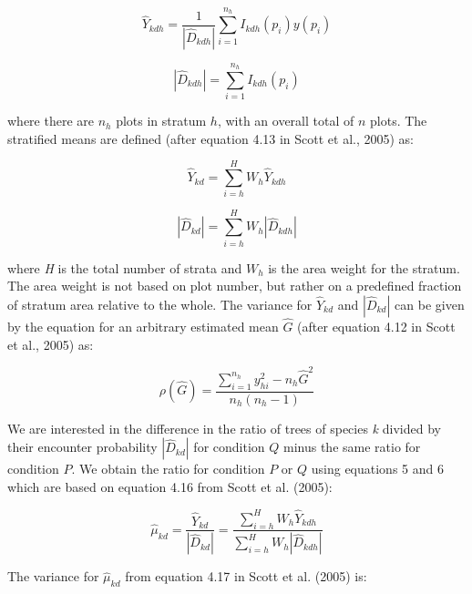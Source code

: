\documentclass[12pt]{article}
\begin{document}
\begin{equation}
\hat{Y}_{kdh} = \frac{1}{|\hat{D}_{kdh}|}\displaystyle\sum_{i=1}^{n_h} I_{kdh}(p_i)y(p_i)  
\end{equation} 

\begin{equation}
|\hat{D}_{kdh}| = \displaystyle\sum_{i=1}^{n_h} I_{kdh}(p_i)
\end{equation} 

where there are $n_h$ plots in stratum $h$, with an overall total of $n$ plots.  The stratified means are defined (after equation 4.13 in Scott et al., 2005) as: 

 \begin{equation} \label{eq:hatY}
\hat{Y}_{kd} = \displaystyle\sum_{i=h}^{H} W_h \hat{Y}_{kdh}
\end{equation} 

\begin{equation}  \label{eq:hatD}
|\hat{D}_{kd}| = \displaystyle\sum_{i=h}^{H} W_h |\hat{D}_{kdh}|
\end{equation} 

where \emph{H} is the total number of strata and $W_h$ is the area weight for the stratum. The area weight is not based on plot number, but rather on a predefined fraction of stratum area relative to the whole.  The variance for $\hat{Y}_{kd}$ and $|\hat{D}_{kd}|$ can be given by the equation for an arbitrary estimated mean $\hat{G}$ (after equation 4.12 in Scott et al., 2005) as:

\begin{equation}
\rho(\hat{G}) = \frac{\displaystyle\sum_{i=1}^{n_h}y^2_{hi} - n_h\hat{G}^2}{n_h(n_h - 1)}
\end{equation}



We are interested in the difference in the ratio of trees of species \emph{k} divided by their encounter probability $|\hat{D}_{kd}|$ for condition $Q$ minus the same ratio for condition $P$.  We obtain the ratio for condition $P$ or $Q$ using equations 5 and 6 which are based on equation 4.16 from Scott et al. (2005):


 \begin{equation}  \label{eq:hatMu}
\hat{\mu}_{kd} = \frac{\hat{Y}_{kd}}{|\hat{D}_{kd}|} = \frac{\displaystyle\sum_{i=h}^{H} W_h \hat{Y}_{kdh}}{ \displaystyle\sum_{i=h}^{H} W_h |\hat{D}_{kdh}|}
\end{equation}
 
The variance for $\hat{\mu}_{kd}$ from equation 4.17 in Scott et al. (2005) is:
\end{document}
